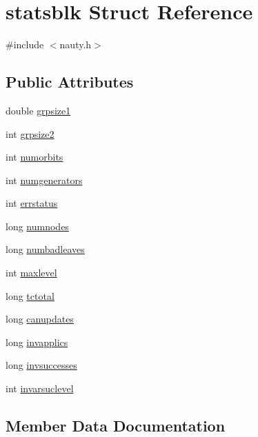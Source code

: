 \hypertarget{structstatsblk}{}\section{statsblk Struct Reference}
\label{structstatsblk}


{\ttfamily \#include $<$nauty.\+h$>$}

\subsection*{Public Attributes}
\begin{DoxyCompactItemize}
\item 
double \mbox{\hyperlink{structstatsblk_a7cc3aa4e6d190b1a56f35a529d2bf9be}{grpsize1}}
\item 
int \mbox{\hyperlink{structstatsblk_a627ae30348213b64304633b339248d40}{grpsize2}}
\item 
int \mbox{\hyperlink{structstatsblk_afc318992d3550eca8a81d77443346b0a}{numorbits}}
\item 
int \mbox{\hyperlink{structstatsblk_ab4319f64706bd392bfc3889bd9962403}{numgenerators}}
\item 
int \mbox{\hyperlink{structstatsblk_aee079f79e0fc9369694d3475f716ff66}{errstatus}}
\item 
long \mbox{\hyperlink{structstatsblk_a0273b46d848cf64f57399fefe64ed5c0}{numnodes}}
\item 
long \mbox{\hyperlink{structstatsblk_a01b2a224befc2a426222f83e06767424}{numbadleaves}}
\item 
int \mbox{\hyperlink{structstatsblk_a5c78ed629084cbae00962a086a3f9993}{maxlevel}}
\item 
long \mbox{\hyperlink{structstatsblk_a05839dbfbfd5887c2498d46d39586bf4}{tctotal}}
\item 
long \mbox{\hyperlink{structstatsblk_a4838f48eb964a2cca0dcd80b0573e876}{canupdates}}
\item 
long \mbox{\hyperlink{structstatsblk_a3c7fe8b64763ebce4f403d1865f6715b}{invapplics}}
\item 
long \mbox{\hyperlink{structstatsblk_a0072871052cc21235c850648720f86aa}{invsuccesses}}
\item 
int \mbox{\hyperlink{structstatsblk_a97c6db6a2b9ac99cf33f302252139e70}{invarsuclevel}}
\end{DoxyCompactItemize}


\subsection{Member Data Documentation}
\mbox{\label{structstatsblk_a4838f48eb964a2cca0dcd80b0573e876}} 
